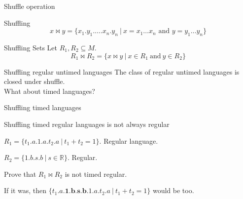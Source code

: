 \begin{frame}{Shuffle operation}
  \begin{block}{Shuffling}
    $$x\bowtie y = \{x_1 . y_1 . \dots . x_n . y_n~|~x=x_1\dots x_n\text{ and }y=y_1\dots y_n\}$$
  \end{block}

  \begin{block}{Shuffling Sets}
    Let $R_1, R_2\subseteq M$.
    $$R_1\bowtie R_2 = \{x\bowtie y~|~x\in R_1~\text{and}~y\in R_2\}$$
  \end{block}

  \begin{exampleblock}{Shuffling regular untimed languages}
    The class of regular untimed languages is closed under shuffle.\\
    What about timed languages?
  \end{exampleblock}
  
\end{frame}


\begin{frame}{Shuffling timed languages}
  \begin{alertblock}{Shuffling timed regular languages is not always regular}
  \end{alertblock}

  $R_1=\{t_1 . a . 1 . a . t_2 . a~|~t_1+t_2 = 1\}$.
  Regular language.

  \begin{figure}
    \centering
  \end{figure}


  $R_2=\{1 . b . s . b ~|~ s\in\mathbb{R}\}$. Regular.

  Prove that $R_1\bowtie R_2$ is not timed regular.

  If it was, then $\{t_1.a.\mathbf{1.b.s.b}.1.a.t_2.a~|~t_1+t_2=1\}$ would be too.
\end{frame}


